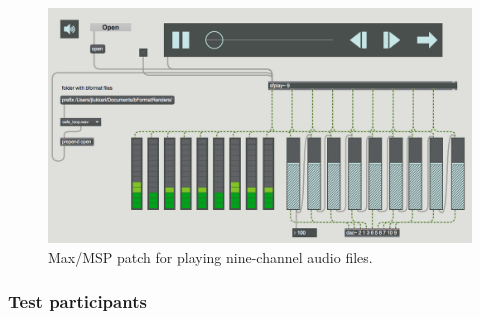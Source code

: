 \documentclass[english, 12pt, a4paper, pdftex, elec, utf8]{aaltothesis}
\begin{document}
\begin{figure}[h]
	\centering
	\includegraphics[width=\textwidth]{max.png}
	\caption{Max/MSP patch for playing nine-channel audio files.}
	\label{fig:max} 
\end{figure}

\subsubsection{Test participants}
\end{document}
